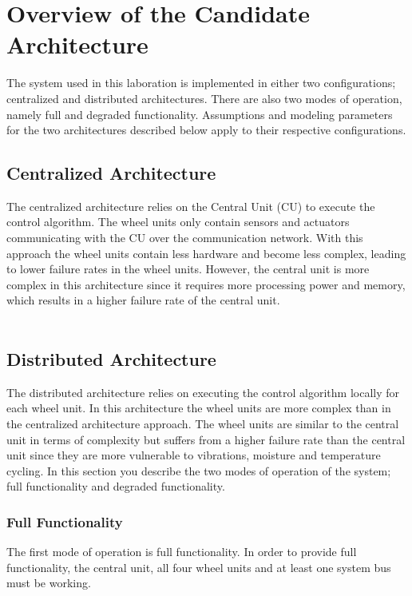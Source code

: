 
\newpage
\section{Overview of the Candidate Architecture}
The system used in this laboration is implemented in either two configurations; centralized and distributed architectures. There are also two modes of operation, namely full and degraded functionality. Assumptions and modeling parameters for the two architectures described below apply to their respective configurations.

\subsection{Centralized Architecture}
The centralized architecture relies on the Central Unit (CU) to execute the control algorithm. The wheel units only contain sensors and actuators communicating with the CU over the communication network. With this approach the wheel units contain less hardware and become less complex, leading to lower failure rates in the wheel units. However, the central unit is more complex in this architecture since it requires more processing power and memory, which results in a higher failure rate of the central unit.\\
\\
\subsection{Distributed Architecture}
The distributed architecture relies on executing the control algorithm locally for each wheel unit. In this architecture the wheel units are more complex than in the centralized architecture approach. The wheel units are similar to the central unit in terms of complexity but suffers from a higher failure rate than the central unit since they are more vulnerable to vibrations, moisture and temperature cycling.
In this section you describe the two modes of operation of the system; full functionality and degraded functionality.
\subsubsection{Full Functionality}
The first mode of operation is full functionality. In order to provide full functionality, the central unit, all four wheel units and at least one system bus must be working.
